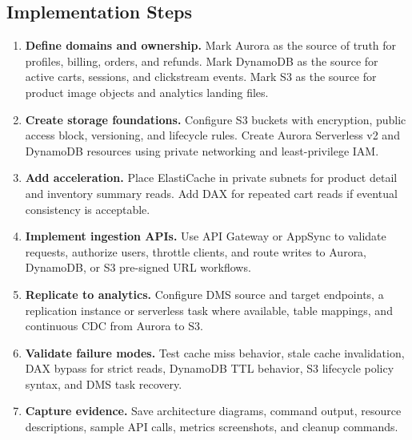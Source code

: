 \subsection*{Implementation Steps}
\begin{enumerate}
    \item \textbf{Define domains and ownership.} Mark Aurora as the source of truth for profiles, billing, orders, and refunds. Mark DynamoDB as the source for active carts, sessions, and clickstream events. Mark S3 as the source for product image objects and analytics landing files.
    \item \textbf{Create storage foundations.} Configure S3 buckets with encryption, public access block, versioning, and lifecycle rules. Create Aurora Serverless v2 and DynamoDB resources using private networking and least-privilege IAM.
    \item \textbf{Add acceleration.} Place ElastiCache in private subnets for product detail and inventory summary reads. Add DAX for repeated cart reads if eventual consistency is acceptable.
    \item \textbf{Implement ingestion APIs.} Use API Gateway or AppSync to validate requests, authorize users, throttle clients, and route writes to Aurora, DynamoDB, or S3 pre-signed URL workflows.
    \item \textbf{Replicate to analytics.} Configure DMS source and target endpoints, a replication instance or serverless task where available, table mappings, and continuous CDC from Aurora to S3.
    \item \textbf{Validate failure modes.} Test cache miss behavior, stale cache invalidation, DAX bypass for strict reads, DynamoDB TTL behavior, S3 lifecycle policy syntax, and DMS task recovery.
    \item \textbf{Capture evidence.} Save architecture diagrams, command output, resource descriptions, sample API calls, metrics screenshots, and cleanup commands.
\end{enumerate}
